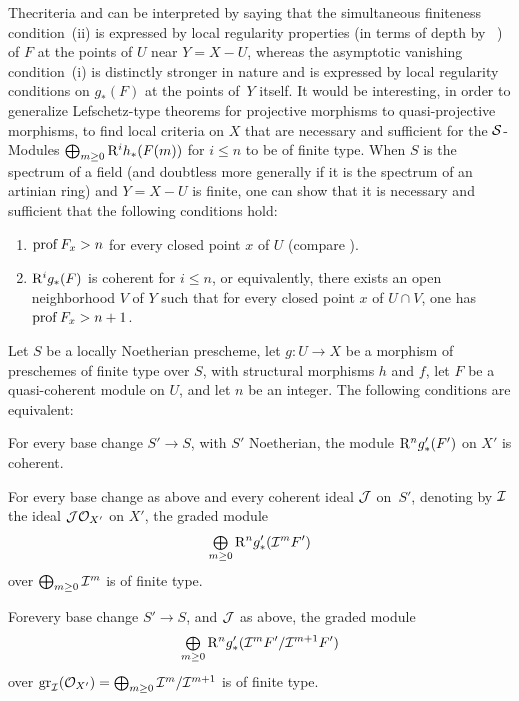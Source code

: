 \begin{remarque} \label{XII.5.6}
The\pageoriginale criteria  and  can be interpreted by saying that the \og simultaneous finiteness condition\fg {}~(ii) is expressed by local regularity properties (in terms of depth by ~) of $F$ at the points of $U$ near $Y=X- U$, whereas the \og asymptotic vanishing condition\fg {}~(i) is distinctly stronger in nature and is expressed by local regularity conditions on $g_\ast(F)$ at the points of~$Y$ itself. It would be interesting, in order to generalize Lefschetz-type theorems for projective morphisms to quasi-projective morphisms, to find local criteria on $X$ that are necessary and sufficient for the $\mathcal S$-Modules $\bigoplus_{m\geq 0} \mathrm R^ih_\ast(F(m))$ for $i\leq n$ to be of finite type. When $S$ is the spectrum of a field (and doubtless more generally if it is the spectrum of an artinian ring) and $Y=X- U$ is finite, one can show that it is necessary and sufficient that the following conditions hold:
\begin{enumerate}
\item[\textup{1\noo)}] $\operatorname{prof} F_x >n$ for every closed point $x$ of $U$ (compare ).
\item[\textup{2\noo)}] $\mathrm R^ig_\ast(F)$ is coherent for $i\leq n$, or equivalently, there exists an open neighborhood $V$ of $Y$ such that for every closed point $x$ of $U\cap V$, one has $\operatorname{prof} F_x >n+1$.
\end{enumerate}
\end{remarque}

\begin{proposition} \label{XII.5.7}
Let $S$ be a locally Noetherian prescheme, let $g:U\to X$ be a morphism of preschemes of finite type over $S$, with structural morphisms $h$ and $f$, let $F$ be a quasi-coherent module on $U$, and let $n$ be an integer. The following conditions are equivalent:
\begin{enumeratei}
\item
For every base change $S'\to S$, with $S'$ Noetherian, the module $\mathrm R^ng'_\ast(F')$ on $X'$ is coherent.
\item
For every base change as above and every coherent ideal $\mathcal J$ on~$S'$, denoting by $\mathcal I$ the ideal $\mathcal J\mathcal O_{X'}$ on $X'$, the graded module
\[
\mathop{\textstyle\bigoplus}\limits_{m\geq 0} \mathrm R^ng'_\ast(\mathcal I^mF')
\]
over $\bigoplus_{m\geq 0} \mathcal I^m$ is of finite type.
\item
For\pageoriginale every base change $S'\to S$, and $\mathcal J$ as above, the graded module
\[
\mathop{\textstyle\bigoplus}\limits_{m\geq 0} \mathrm R^ng'_\ast(\mathcal I^mF'/\mathcal I^{m+1}F')
\]
over $\operatorname{gr}_\mathcal I(\mathcal O_{X'})=\bigoplus_{m\geq 0} \mathcal I^m/\mathcal I^{m+1}$ is of finite type.
\end{enumeratei}
\end{proposition}

